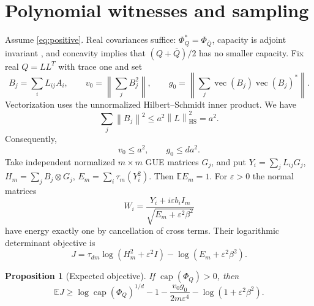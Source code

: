 \documentclass[11pt]{article}
\newtheorem{proposition}[theorem]{Proposition}
\newcommand{\E}{\mathbb E}
\newcommand{\capop}{\operatorname{cap}}
\newcommand{\vecop}{\operatorname{vec}}
\newcommand{\norm}[1]{\left\lVert#1\right\rVert}
\begin{document}
\section{Polynomial witnesses and sampling}\label{sec:poly}
Assume \eqref{eq:positive}. Real covariances suffice: $\Phi_Q^*=\Phi_{\overline Q}$, capacity is adjoint invariant \cite{ms}, and concavity implies that $(Q+\overline Q)/2$ has no smaller capacity. Fix real $Q=LL^T$ with trace one and set
\begin{equation}\label{eq:parameters}
 B_j=\sum_iL_{ij}A_i,\qquad v_0=\norm{\sum_jB_j^2},\qquad
 g_0=\norm{\sum_j\vecop(B_j)\vecop(B_j)^*}.
\end{equation}
Vectorization uses the unnormalized Hilbert--Schmidt inner product. We have
\[
 \sum_j\norm{B_j}^2\le a^2\norm L_{\mathrm{HS}}^2=a^2.
\]
Consequently,
\begin{equation}\label{eq:coarse}
 v_0\le a^2,\qquad g_0\le da^2.
\end{equation}
Take independent normalized $m\times m$ GUE matrices $G_j$, and put $Y_i=\sum_jL_{ij}G_j$, $H_m=\sum_jB_j\otimes G_j$, $E_m=\sum_i\tau_m(Y_i^2)$. Then $\E E_m=1$. For $\varepsilon>0$ the normal matrices
\begin{equation}\label{eq:normalW}
 W_i=\frac{Y_i+i\varepsilon b_iI_m}{\sqrt{E_m+\varepsilon^2\beta^2}}
\end{equation}
have energy exactly one by cancellation of cross terms. Their logarithmic determinant objective is
\begin{equation}\label{eq:J}
 J=\tau_{dm}\log(H_m^2+\varepsilon^2I)-\log(E_m+\varepsilon^2\beta^2).
\end{equation}
\begin{proposition}[Expected objective]\label{prop:expected}
If $\capop(\Phi_Q)>0$, then
\begin{equation}\label{eq:expected}
 \E J\ge\log\capop(\Phi_Q)^{1/d}-1
 -\frac{v_0g_0}{2m\varepsilon^4}-\log(1+\varepsilon^2\beta^2).
\end{equation}
\end{proposition}
\end{document}
